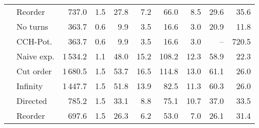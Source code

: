 \begin{tabular}{llrrrrrrrr}
       & Reorder &                    737.0 &             1.5 &                                            27.8 &                                              7.2 &                                              66.0 &                                                8.5 &   29.6 &   35.6 \\
\addlinespace \multirow{7}{*}{\rotatebox[origin=c]{90}{London}} & No turns &                    363.7 &             0.6 &                                             9.9 &                                              3.5 &                                              16.6 &                                                3.0 &   20.9 &   11.8 \\
       & CCH-Pot. &                    363.7 &             0.6 &                                             9.9 &                                              3.5 &                                              16.6 &                                                3.0 &    -- &  720.5 \\
       & Naive exp. &                   1\,534.2 &             1.1 &                                            48.0 &                                             15.2 &                                             108.2 &                                               12.3 &   58.9 &   22.3 \\
       & Cut order &                   1\,680.5 &             1.5 &                                            53.7 &                                             16.5 &                                             114.8 &                                               13.0 &   61.1 &   26.0 \\
       & Infinity &                   1\,447.7 &             1.5 &                                            51.8 &                                             13.9 &                                              82.5 &                                               11.3 &   60.3 &   26.0 \\
       & Directed &                    785.2 &             1.5 &                                            33.1 &                                              8.8 &                                              75.1 &                                               10.7 &   37.0 &   33.5 \\
       & Reorder &                    697.6 &             1.5 &                                            26.3 &                                              6.2 &                                              53.0 &                                                7.0 &   26.1 &   31.4 \\

\end{tabular}

